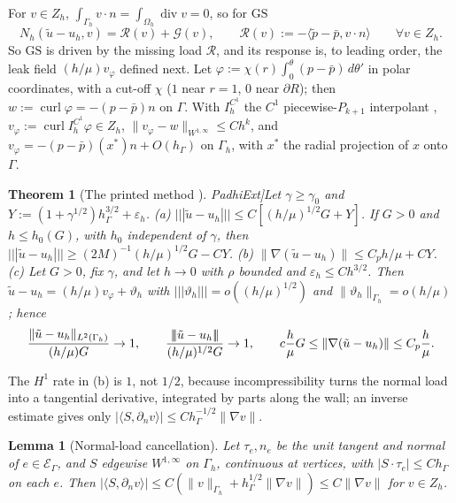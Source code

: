 \documentclass[5p,times]{elsarticle}
\newtheorem{theorem}{Theorem}
\newtheorem{lemma}{Lemma}
\theoremstyle{definition}
\newcommand{\hG}{h_\Gamma}
\newcommand{\Gh}{\Gamma_h}
\newcommand{\Oh}{\Omega_h}
\newcommand{\EG}{\mathcal E_\Gamma}
\newcommand{\Zh}{Z_h}
\newcommand{\dn}{\partial_n}
\newcommand{\ut}{\tilde u}
\newcommand{\pt}{\tilde p}
\newcommand{\pbar}{\bar p}
\newcommand{\ip}[2]{\langle #1,#2\rangle}
\newcommand{\tnorm}[1]{|\!|\!|#1|\!|\!|}
\newcommand{\norm}[1]{\lVert #1\rVert}
\newcommand{\GS}{\mathrm{GS}}
\newcommand{\eps}{\varepsilon_h}
\newcommand{\Gc}{\mathcal G}
\newcommand{\Rc}{\mathcal R}
\newcommand{\curl}{\operatorname{curl}}
\renewcommand{\div}{\operatorname{div}}
\newcommand{\ext}[1]{\cite[#1]{PadhiExt}}
\begin{document}
For $v\in\Zh$, $\int_{\Gh}v\cdot n=\int_{\Oh}\div v=0$, so for $\GS$
\begin{equation}\label{eq:gserr}
N_h(\ut-u_h,v)=\Rc(v)+\Gc(v),\qquad \Rc(v):=-\ip{\pt-\pbar}{v\cdot n}\qquad\forall v\in\Zh .
\end{equation}
So $\GS$ is driven by the missing load $\Rc$, and its response is, to leading order, the leak field $(h/\mu)v_\varphi$ defined next. Let $\varphi:=\chi(r)\int_0^\theta(p-\pbar)\,d\theta'$ in polar coordinates, with a cut-off $\chi$ ($1$ near $r=1$, $0$ near $\partial R$); then $w:=\curl\varphi=-(p-\pbar)n$ on $\Gamma$. With $I_h^{C^1}$ the $C^1$ piecewise-$P_{k+1}$ interpolant \cite{MorganScott1975}, $v_\varphi:=\curl I_h^{C^1}\varphi\in\Zh$, $\norm{v_\varphi-w}_{W^{1,\infty}}\le Ch^k$, and $v_\varphi=-(p-\pbar)(x^\ast)n+O(\hG)$ on $\Gh$, with $x^\ast$ the radial projection of $x$ onto $\Gamma$.

\begin{theorem}[The printed method \ext{\S6}]\label{thm:gs}
Let $\gamma\ge\gamma_0$ and $Y:=(1+\gamma^{1/2})\hG^{3/2}+\eps$. (a) $\tnorm{\ut-u_h}\le C[(h/\mu)^{1/2}G+Y]$. If $G>0$ and $h\le h_0(G)$, with $h_0$ independent of $\gamma$, then $\tnorm{\ut-u_h}\ge(2M)^{-1}(h/\mu)^{1/2}G-CY$. (b) $\norm{\nabla(\ut-u_h)}\le C_ph/\mu+CY$.
(c) Let $G>0$, fix $\gamma$, and let $h\to0$ with $\rho$ bounded and $\eps\le Ch^{3/2}$. Then $\ut-u_h=(h/\mu)v_\varphi+\vartheta_h$ with $\tnorm{\vartheta_h}=o((h/\mu)^{1/2})$ and $\norm{\vartheta_h}_{\Gh}=o(h/\mu)$; hence
\begin{gather*}
\frac{\norm{\ut-u_h}_{L^2(\Gh)}}{(h/\mu)G}\to1,\qquad \frac{\tnorm{\ut-u_h}}{(h/\mu)^{1/2}G}\to1,\ifdefined\FIVEP\\\else\qquad\fi c\frac h\mu G\le\norm{\nabla(\ut-u_h)}\le C_p\frac h\mu .
\end{gather*}
\end{theorem}

The $H^1$ rate in (b) is $1$, not $1/2$, because incompressibility turns the normal load into a tangential derivative, integrated by parts along the wall; an inverse estimate gives only $|\ip{S}{\dn v}|\le C\hG^{-1/2}\norm{\nabla v}$.

\begin{lemma}[Normal-load cancellation]\label{lem:cancel}
Let $\tau_e,n_e$ be the unit tangent and normal of $e\in\EG$, and $S$ edgewise $W^{1,\infty}$ on $\Gh$, continuous at vertices, with $|S\cdot\tau_e|\le C\hG$ on each $e$. Then $|\ip{S}{\dn v}|\le C(\norm v_{\Gh}+\hG^{1/2}\norm{\nabla v})\le C\norm{\nabla v}$ for $v\in\Zh$.
\end{lemma}
\end{document}
